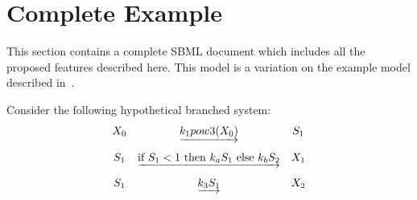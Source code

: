 \documentclass{cekarticle}
\begin{document}
\section{Complete Example}
\label{sec:example}

This section contains a complete SBML document which
includes all the proposed features described here.  This model is a
variation on the example model described in~\citet{hucka:2001}.

Consider the following hypothetical branched system:
\begin{equation*}
  \begin{array}{@{}ccc@{}}
    X_0 & \underrightarrow{k_1 pow3(X_0)} & S_1 \\ \\[-4pt]
    S_1 & \underrightarrow{\text{if $S_1 < 1$ then $k_a S_1$ else $k_b S_2$}} & X_1 \\ \\[-4pt]
    S_1 & \underrightarrow{k_3 S_1} & X_2
  \end{array}
\end{equation*}
\end{document}
